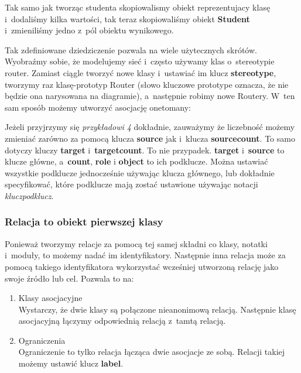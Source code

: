 \documentclass[a4paper,11pt]{article}
\begin{document}


Tak samo jak tworząc studenta skopiowalismy obiekt reprezentujacy klasę i~dodaliśmy kilka
wartości, tak teraz skopiowaliśmy obiekt \textbf{Student} i~zmieniliśmy jedno z~pól obiektu
wynikowego.

Tak zdefiniowane dziedziczenie pozwala na wiele użytecznych skrótów. Wyobraźmy sobie, że modelujemy
sieć i~często używamy klas o~stereotypie router. Zamiast ciągle tworzyć nowe klasy i~ustawiać im
klucz \textbf{stereotype}, tworzymy raz klasę-prototyp Router (słowo kluczowe prototype oznacza, że nie będzie
ona narysowana na diagramie), a~następnie robimy nowe Routery. W~ten sam sposób możemy utworzyć
asocjację one\dywiz to\dywiz many:



Jeżeli przyjrzymy się \emph{przykładowi 4} dokładnie, zauważymy że liczebność możemy zmieniać
zarówno za pomocą klucza \textbf{source} jak i~klucza \textbf{source\dywiz count}. To samo dotyczy
kluczy \textbf{target} i~\textbf{target\dywiz count}. To nie przypadek. \textbf{target}
i~\textbf{source} to klucze główne, a~\textbf{count}, \textbf{role} i \textbf{object} to ich
podklucze. Można ustawiać wszystkie podklucze jednocześnie używając klucza głównego, lub dokładnie
specyfikować, które podklucze mają zostać ustawione używając notacji \emph{klucz\dywiz podklucz}.

\subsubsection{Relacja to obiekt pierwszej klasy}
Ponieważ tworzymy relacje za pomocą tej samej składni co klasy, notatki i~moduły, to możemy nadać im
identyfikatory. Następnie inna relacja może za pomocą takiego identyfikatora wykorzystać wcześniej
utworzoną relację jako swoje źródło lub cel. Pozwala to na:
\begin{enumerate}
  \item{Klasy asocjacyjne} \\
    Wystarczy, że dwie klasy są połączone nieanonimową relacją. Następnie klasę asocjacyjną łączymy
    odpowiednią relacją z~tamtą relacją.
  \item{Ograniczenia} \\
    Ograniczenie to tylko relacja łącząca dwie asocjacje ze sobą. Relacji takiej możemy ustawić
    klucz \textbf{label}.
\end{enumerate}
\end{document}
